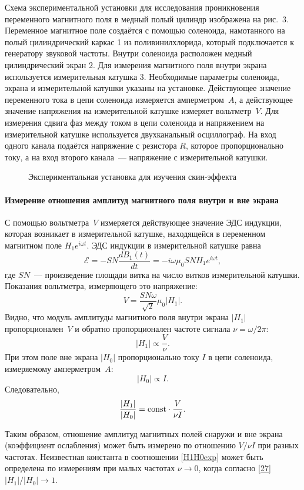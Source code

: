 \experiment
Схема экспериментальной установки для исследования проникновения переменного магнитного поля в медный полый цилиндр
изображена на рис.~3. Переменное магнитное поле создаётся с помощью соленоида, намотанного на полый цилиндрический каркас 1
из поливинилхлорида, который подключается к генератору звуковой частоты. Внутри соленоида расположен медный цилиндрический
экран 2. Для измерения магнитного поля внутри экрана используется измерительная катушка 3. Необходимые параметры
соленоида, экрана и измерительной катушки указаны на установке. Действующее значение переменного тока в цепи соленоида
измеряется амперметром~$A$, а действующее значение напряжения
на измерительной катушке измеряет вольтметр~$V$. Для измерения сдвига фаз между током в цепи соленоида и напряжением на измерительной катушке
используется двухканальный осциллограф. На вход одного канала подаётся напряжение с резистора $R$, которое
пропорционально току, а на вход второго канала~--- напряжение с измерительной катушки.

\begin{figure}[h!]
    \centering
    \caption{Экспериментальная установка для изучения скин-эффекта}
\end{figure}
\paragraph{Измерение отношения амплитуд магнитного поля внутри и вне экрана}

С помощью вольтметра~$V$ измеряется действующее значение ЭДС индукции,
которая возникает в измерительной катушке, находящейся в переменном магнитном поле
$H_1e^{i\omega t}$.
ЭДС индукции в измерительной катушке равна
\[
\mathcal{E}=-SN\frac{dB_{1}(t)}{dt}=-i\omega \mu_0 S N H_1 e^{i\omega t},
\]
где $SN$~--- произведение площади витка на число витков измерительной катушки.
Показания вольтметра, измеряющего это напряжение:
\[
V= \frac{SN\omega}{\sqrt{2}}\mu_0|H_1|.
\]
Видно, что модуль амплитуды магнитного поля внутри экрана $|H_1|$ пропорционален~$V$
и обратно пропорционален частоте сигнала $\nu = \omega / 2\pi$:
\[
|H_1|\propto \frac{V}{\nu}.
\]
При этом поле вне экрана $|H_0|$ пропорционально току $I$ в цепи соленоида,
измеряемому амперметром~$A$:
\[
|H_0| \propto I.
\]
Следовательно,
\begin{equation} \eqmark{H1H0exp}
\frac{|H_1|}{|H_0|} = \const \cdot \frac{V}{\nu I}.
\end{equation}

Таким образом, отношение амплитуд магнитных полей снаружи и вне экрана
(коэффициент ослабления) может быть измерено
по отношению $V/\nu I$ при разных частотах. Неизвестная константа
в соотношении \eqref{H1H0exp} может быть определена по измерениям
при малых частотах $\nu \to 0$, когда согласно \eqref{27} $|H_1|/|H_0| \to 1$.

